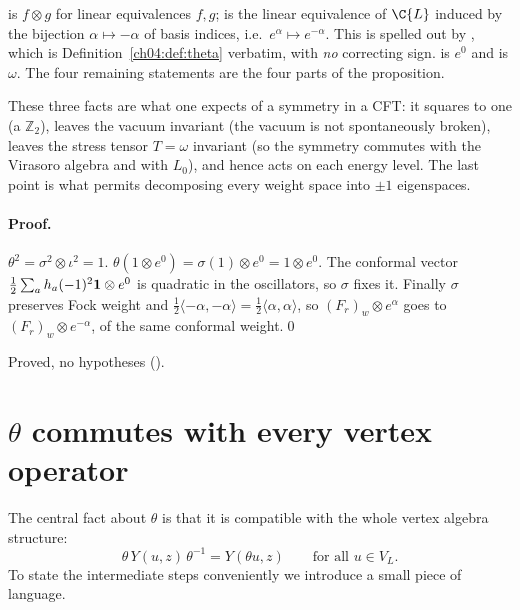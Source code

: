 \begin{dictionary}
 is $f\otimes g$ for linear equivalences $f,g$;
 is the linear equivalence of $\C\{L\}$ induced by the
bijection $\alpha\mapsto-\alpha$ of basis indices, i.e.\ $e^\alpha\mapsto e^{-\alpha}$. This is spelled
out by , which is Definition~\ref{ch04:def:theta} verbatim, with \emph{no}
correcting sign.  is $e^0$ and  is $\omega$. The four
remaining statements are the four parts of the proposition.
\end{dictionary}

\begin{physics}
These three facts are what one expects of a symmetry in a CFT: it squares to one (a $\mathbb Z_2$), leaves the vacuum invariant (the vacuum is not spontaneously broken), leaves the stress tensor $T=\omega$ invariant (so the symmetry commutes with the Virasoro algebra and with $L_0$), and hence acts on each energy level. The last point is what permits decomposing every weight space into $\pm1$ eigenspaces.
\end{physics}

\paragraph{Proof.} $\theta^2=\sigma^2\otimes\iota^2=1$. $\theta(1\otimes e^0)=\sigma(1)\otimes
e^0=1\otimes e^0$. The conformal vector $\tfrac12\sum_a h_a(-1)^2\mathbf{1}\otimes e^0$ is quadratic
in the oscillators, so $\sigma$ fixes it. Finally $\sigma$ preserves Fock weight and
$\tfrac12\langle-\alpha,-\alpha\rangle=\tfrac12\langle\alpha,\alpha\rangle$, so $(F_r)_w\otimes e^\alpha$
goes to $(F_r)_w\otimes e^{-\alpha}$, of the same conformal weight.\qed

\begin{status}
Proved, no hypotheses ().
\end{status}
\section{\texorpdfstring{$\theta$}{theta} commutes with every vertex operator}\label{ch04:sec:intertw}

The central fact about $\theta$ is that it is compatible with the whole vertex algebra structure:
\begin{equation}\label{ch04:eq:thetaY}
  \theta\,Y(u,z)\,\theta^{-1}=Y(\theta u,z)\qquad\text{for all }u\in V_L .
\end{equation}
To state the intermediate steps conveniently we introduce a small piece of language.

